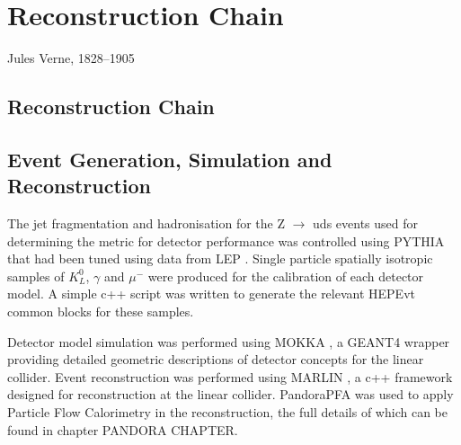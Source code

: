 \chapter{Reconstruction Chain}
\label{chap:reconstructionchain}

{Jules Verne, 1828--1905}

\section{Reconstruction Chain}

\section{Event Generation, Simulation and Reconstruction}

The jet fragmentation and hadronisation for the Z $\rightarrow$ uds events used for determining the metric for detector performance was controlled using PYTHIA \cite{Sjostrand:2006za} that had been tuned using data from LEP \cite{Alexander:1995bk}.  Single particle spatially isotropic samples of $K_{L}^{0}$, $\gamma$ and $\mu^{-}$ were produced for the calibration of each detector model.  A simple c++ script was written to generate the relevant HEPEvt common blocks for these samples. 

Detector model simulation was performed using MOKKA \cite{MoradeFreitas:2002kj}, a GEANT4 \cite{Agostinelli:2002hh} wrapper providing detailed geometric descriptions of detector concepts for the linear collider.  Event reconstruction was performed using MARLIN \cite{Gaede:2006pj}, a c++ framework designed for reconstruction at the linear collider.  PandoraPFA \cite{arXiv:0907.3577, arXiv:1209.4039} was used to apply Particle Flow Calorimetry in the reconstruction, the full details of which can be found in chapter PANDORA CHAPTER.
